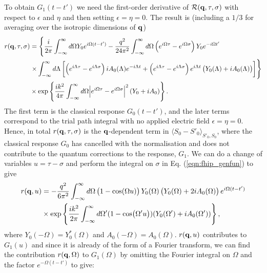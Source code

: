 To obtain $G_1(t - t')$ we need the first-order derivative of $\mathcal{R}(\vb{q}, \tau, \sigma)$ with respect to $\epsilon$ and $\eta$ and then setting $\epsilon = \eta = 0$. The result is (including a $1/3$ for averaging over the isotropic dimensions of $\vb{q}$)
\begin{equation}
    \begin{aligned}
    r(\vb{q}, \tau, \sigma) &= \left\{ \frac{i}{2\pi} \int^\infty_{-\infty} d\Omega Y_0 e^{i \Omega (t - t')}
    - \frac{q^2}{24 \pi^2} \int^\infty_{-\infty} d\Omega \left( e^{i\Omega\tau} - e^{i\Omega\sigma} \right) Y_0 e^{-i\Omega t'} \right. \\
    &\left. \times \int^\infty_{-\infty} d\Lambda \left[\left( e^{i\Lambda\tau} - e^{i\Lambda\sigma} \right) i A_0(\Lambda) e^{-i\Lambda t} + \left( e^{i\Lambda\tau} - e^{i\Lambda\sigma} \right) e^{i\Lambda t} \left( Y_0(\Lambda) + i A_0(\Lambda) \right)\right] \right\} \\
    &\times \exp \left\{ \frac{ik^2}{4\pi} \int^{\infty}_{-\infty} d\Omega \abs{e^{i\Omega\tau} - e^{i\Omega\sigma}}^2 \left( Y_0 + i A_0 \right) \right\}.
    \end{aligned}
\end{equation}
The first term is the classical response $G_0(t - t')$, and the later terms correspond to the trial path integral with no applied electric field $\epsilon = \eta = 0$. Hence, in total $r(\vb{q}, \tau, \sigma)$ is the $\vb{q}$-dependent term in $\langle S_0 - S'_0 \rangle_{S'_0, S_0}$, where the classical response $G_0$ has cancelled with the normalisation and does not contribute to the quantum corrections to the response, $G_1$. We can do a change of variables $u = \tau - \sigma$ and perform the integral on $\sigma$ in Eq. (\ref{eqn:fhip_genfun}) to give
\begin{equation}
    \begin{aligned}
        r(\vb{q}, u) &=  -\frac{q^2}{6\pi^2} \int^{\infty}_{-\infty} d\Omega \left(1 - \cos(\Omega u) \right) Y_0(\Omega) \left( Y_0(\Omega) + 2i A_0(\Omega) \right) e^{i\Omega (t - t')} \\
        &\times \exp\left\{ \frac{ik^2}{2\pi} \int^\infty_{-\infty} d\Omega' (1 - \cos(\Omega' u)) (Y_0(\Omega') + i A_0(\Omega')) \right\},
    \end{aligned}
\end{equation}
where $Y_0(-\Omega) = Y^*_0(\Omega)$ and $A_0(-\Omega) = A_0(\Omega)$. $r(\vb{q}, u)$ contributes to $G_1(u)$ and since it is already of the form of a Fourier transform, we can find the contribution $r(\vb{q}, \Omega)$ to $G_1(\Omega)$ by omitting the Fourier integral on $\Omega$ and the factor $e^{-\Omega(t - t')}$ to give:
